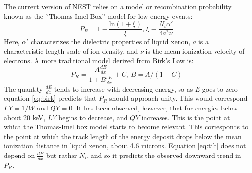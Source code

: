 The current version of NEST relies on a model or recombination probability known as the ``Thomas-Imel Box'' model for low energy events\cite{nest1,tib1,tib2}:
\begin{equation}\label{eq:tib}
P_R=1-\frac{\text{ln}(1+\xi)}{\xi} \text{, } \xi \equiv \frac{N_i \alpha'}{4a^2\nu}
\end{equation}
Here, $\alpha'$ characterizes the dielectric properties of liquid xenon, $a$ is a characteristic length scale of ion density, and $\nu$ is the mean ionization velocity of electrons. A more traditional model derived from Birk's Law is\cite{nest1}:
\begin{equation}\label{eq:birk}
P_R=\frac{A\frac{dE}{dx}}{1+B\frac{dE}{dx}}+C , \ B=A/(1-C)
\end{equation}
The quantity $\frac{dE}{dx}$ tends to increase with decreasing energy, so as $E$ goes to zero equation \ref{eq:birk} predicts that $P_R$ should approach unity. This would correspond $LY=1/W$ and $QY=0$. It has been observed, however, that for energies below about 20 keV, $LY$ begins to decrease, and $QY$ increases. This is the point at which the Thomas-Imel box model starts to become relevant. This corresponds to the point at which the track length of the energy deposit drops below the mean ionization distance in liquid xenon, about 4.6 microns. Equation \ref{eq:tib} does not depend on $\frac{dE}{dx}$ but rather $N_i$, and so it predicts the observed downward trend in $P_R$.  

